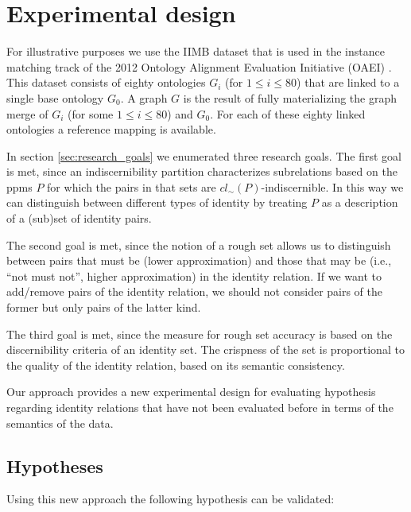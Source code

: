\section{Experimental design}
\label{sec:experimental_design}

For illustrative purposes we use the IIMB dataset that is used in the
  instance matching track of the 2012 Ontology Alignment Evaluation
  Initiative (OAEI) \cite{oaei_2012}.
This dataset consists of eighty ontologies $G_i$ (for $1 \leq i \leq 80$)
  that are linked to a single base ontology $G_0$.
A graph $G$ is the result of fully materializing the graph merge
  of $G_i$ (for some $1 \leq i \leq 80$) and $G_0$.
For each of these eighty linked ontologies a reference mapping is available.

In section \ref{sec:research_goals} we enumerated three research goals.
The first goal is met, since an indiscernibility partition characterizes
  subrelations based on the ppms $P$ for which the pairs in that sets
  are $cl_{\sim}(P)$-indiscernible.
In this way we can distinguish between different types of identity
  by treating $P$ as a description of a (sub)set of identity pairs.

The second goal is met, since the notion of a rough set allows us to
  distinguish between pairs that must be (lower approximation)
  and those that may be (i.e., ``not must not'', higher approximation)
  in the identity relation.
If we want to add/remove pairs of the identity relation,
  we should not consider pairs of the former but only pairs of
  the latter kind.

The third goal is met, since the measure for rough set accuracy
  is based on the discernibility criteria of an identity set.
The crispness of the set is proportional to the quality of the
  identity relation, based on its semantic consistency.

Our approach provides a new experimental design for evaluating
  hypothesis regarding identity relations that have not been
  evaluated before in terms of the semantics of the data.

\subsection{Hypotheses}
\label{sec:hypotheses}

Using this new approach the following hypothesis can be validated:

